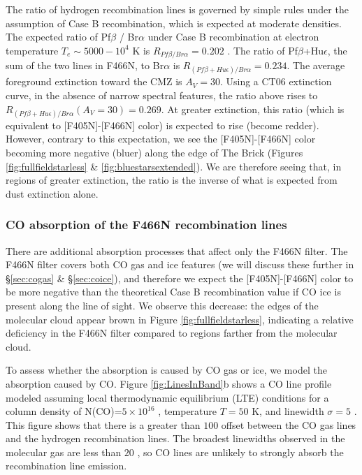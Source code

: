 \documentclass[times,astrosymb,twocolumn]{aastex631}
\def\rr#1{#1}
\begin{document}
The ratio of hydrogen recombination lines is governed by simple rules under the assumption of Case B recombination, which is expected at moderate densities.
The expected ratio of Pf$\beta$ / Br$\alpha$ under Case B recombination at electron temperature $T_e\sim5000-10^4$ K is $R_{Pf\beta/Br\alpha} = 0.202$ \citep{Storey1995}.
The ratio of Pf$\beta$+Hu$\epsilon$, the sum of the two lines in F466N, to Br$\alpha$ is $R_{(Pf\beta+Hu\epsilon)/Br\alpha} = 0.234$.
The average foreground extinction toward the CMZ \citep{Launhardt2002,Nogueras-Lara2021} \rr{is $A_V=30$.}
Using a CT06 extinction curve, \rr{in the absence of narrow spectral features, the ratio above} rises to $R_{(Pf\beta+Hu\epsilon)/Br\alpha}(A_V=30) = 0.269$.
At \rr{greater} extinction, this ratio (\rr{which is equivalent to [F405N]-[F466N] color}) is expected to rise \rr{(become redder)}.
However, contrary to this expectation, we see the \rr{[F405N]-[F466N] color becoming more negative (bluer)} along the edge of The Brick (Figures \ref{fig:fullfieldstarless} \& \ref{fig:bluestarsextended}).
We are therefore seeing that, in \rr{regions of greater} extinction, the ratio is the inverse of what is expected from dust extinction \rr{alone}.



\subsubsection{CO absorption of the F466N recombination lines}
\label{sec:coabsorbrecomb}
There are additional absorption processes that affect only the F466N filter.
The F466N filter covers both CO gas and ice features (we will discuss these further in \S \ref{sec:cogas} \& \S \ref{sec:coice}), and therefore we expect the \rr{[F405N]-[F466N] color} to be \rr{more negative} than the theoretical Case B recombination value if CO ice is present along the line of sight.
We observe this decrease: the edges of the molecular cloud appear brown in Figure \ref{fig:fullfieldstarless}, indicating a relative deficiency in the F466N filter compared to regions f\rr{a}rther from the molecular cloud.

To assess whether the absorption is caused by CO gas or ice, we model the absorption caused by CO.
Figure \ref{fig:LinesInBand}b shows a CO line profile modeled assuming local thermodynamic equilibrium (LTE) conditions for a column density of N(CO)=$5\times10^{16}$ \persc, temperature $T=50$ K, and linewidth $\sigma=5$ \kms.
This figure shows that there is a \rr{greater than} $100$ \kms offset between the CO gas lines and the hydrogen recombination lines.
The broadest linewidths observed in the molecular gas are \rr{less than} $20$ \kms \citep{Henshaw2019}, so CO lines are unlikely to strongly absorb the recombination line emission.
\end{document}

